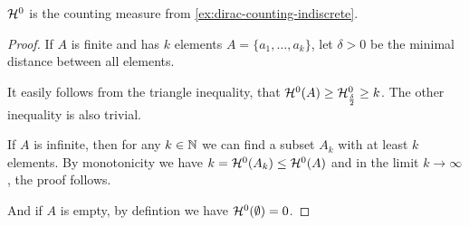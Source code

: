 \begin{rem}[]
  $\mathcal{H}^{0}$ is the counting measure from \ref{ex:dirac-counting-indiscrete}.
\end{rem}
\begin{proof}
  If $A$ is finite and has $k$ elements $A = \{a_1,\ldots,a_k\}$, let $\delta > 0$ be the minimal distance between all elements.

  It easily follows from the triangle inequality, that $\mathcal{H}^{0}(A) \geq \mathcal{H}_{\frac{\delta}{2}}^{0} \geq k$.
  The other inequality is also trivial.

  If $A$ is infinite, then for any $k \in \mathbb{N}$ we can find a subset $A_k$ with at least $k$ elements. By monotonicity we have $k = \mathcal{H}^{0}(A_k) \leq \mathcal{H}^{0}(A)$ and in the limit $k \to  \infty$, the proof follows.

  And if $A$ is empty, by defintion we have $\mathcal{H}^{0}(\emptyset) = 0$.
\end{proof}
